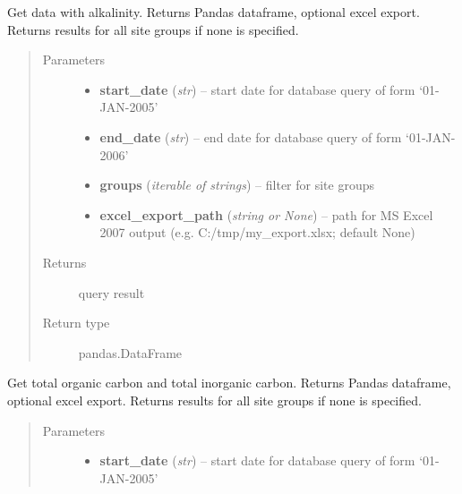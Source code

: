 \documentclass[letterpaper,10pt,english]{sphinxmanual}
\begin{document}
\begin{fulllineitems}
\begin{fulllineitems}
\label{modules:webb_utils.retrieve_data.RetrieveData.get_data_with_alkalinity}
Get data with alkalinity. Returns Pandas dataframe, optional excel export.
Returns results for all site groups if none is specified.
\begin{quote}\begin{description}
\item[{Parameters}] \leavevmode\begin{itemize}
\item {} 
\textbf{start\_date} (\emph{str}) -- start date for database query of form `01-JAN-2005'

\item {} 
\textbf{end\_date} (\emph{str}) -- end date for database query of form `01-JAN-2006'

\item {} 
\textbf{groups} (\emph{iterable of strings}) -- filter for site groups

\item {} 
\textbf{excel\_export\_path} (\emph{string or None}) -- path for MS Excel 2007 output (e.g. C:/tmp/my\_export.xlsx; default None)

\end{itemize}

\item[{Returns}] \leavevmode
query result

\item[{Return type}] \leavevmode
pandas.DataFrame

\end{description}\end{quote}

\end{fulllineitems}


\begin{fulllineitems}
\label{modules:webb_utils.retrieve_data.RetrieveData.get_piezo_sites}
Get total organic carbon and total inorganic carbon.
Returns Pandas dataframe, optional excel export.
Returns results for all site groups if none is specified.
\begin{quote}\begin{description}
\item[{Parameters}] \leavevmode\begin{itemize}
\item {} 
\textbf{start\_date} (\emph{str}) -- start date for database query of form `01-JAN-2005'


\end{itemize}
\end{description}
\end{quote}
\end{fulllineitems}
\end{fulllineitems}
\end{document}
